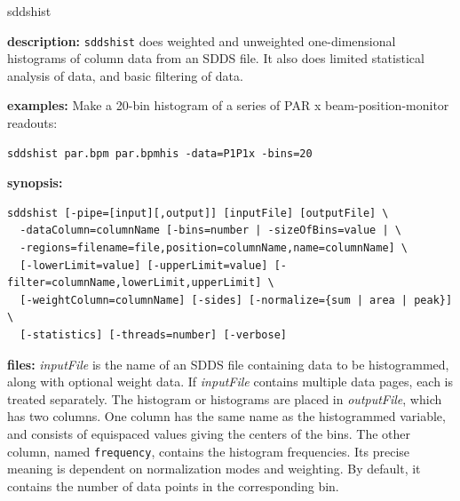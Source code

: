 \begin{sddsprog}{sddshist}
  \item \textbf{description:}
    \verb|sddshist| does weighted and unweighted one-dimensional histograms of column data from an SDDS file. It also does limited statistical analysis of data, and basic filtering of data.
  \item \textbf{examples:}
    Make a 20-bin histogram of a series of PAR x beam-position-monitor readouts:
    \begin{verbatim}
sddshist par.bpm par.bpmhis -data=P1P1x -bins=20
    \end{verbatim}
  \item \textbf{synopsis:}
    \begin{verbatim}
sddshist [-pipe=[input][,output]] [inputFile] [outputFile] \
  -dataColumn=columnName [-bins=number | -sizeOfBins=value | \
  -regions=filename=file,position=columnName,name=columnName] \
  [-lowerLimit=value] [-upperLimit=value] [-filter=columnName,lowerLimit,upperLimit] \
  [-weightColumn=columnName] [-sides] [-normalize={sum | area | peak}] \
  [-statistics] [-threads=number] [-verbose]
    \end{verbatim}
  \item \textbf{files:}
    \emph{inputFile} is the name of an SDDS file containing data to be histogrammed, along with optional weight data. If \emph{inputFile} contains multiple data pages, each is treated separately. The histogram or histograms are placed in \emph{outputFile}, which has two columns. One column has the same name as the histogrammed variable, and consists of equispaced values giving the centers of the bins. The other column, named \verb|frequency|, contains the histogram frequencies. Its precise meaning is dependent on normalization modes and weighting. By default, it contains the number of data points in the corresponding bin.


\end{sddsprog}
